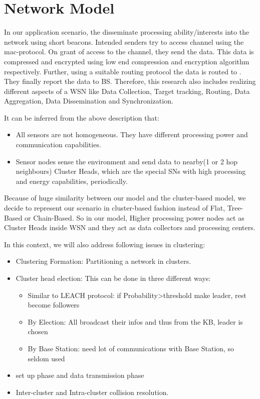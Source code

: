 \chapter{Network Model}\label{ch:model}


In our application scenario, the \chs disseminate processing ability/interests into the network using short beacons. Intended senders try to access channel using the mac-protocol. On grant of access to the channel, they send the data. This data is compressed and encrypted using low end compression and encryption algorithm respectively. Further, using a suitable routing protocol the data is routed to \chs. They finally report the data to BS. Therefore, this research also includes realizing different aspects of a \acf{WSN} like Data Collection, Target tracking, Routing, Data Aggregation, Data Dissemination and Synchronization. 

It can be inferred from the above description that:
\begin{itemize}
	
	\item All sensors are not homogeneous. They have different processing power and communication capabilities.
	
	\item Sensor nodes sense the environment and send data to nearby(1 or 2 hop neighbours) Cluster Heads, which are the special \acp{SN} with high processing and energy capabilities, periodically.
	
\end{itemize}

Because of huge similarity between our model and the cluster-based model, we decide to represent our scenario in cluster-based fashion instead of Flat, Tree-Based or Chain-Based. So in our model, Higher processing power nodes act as Cluster Heads inside \acf{WSN} and they act as data collectors and processing centers.

In this context, we will also address following issues in clustering:

\begin{itemize}
\item Clustering Formation: Partitioning a network in clusters.

\item Cluster head election: This can be done in three different ways:

\begin{itemize}
\item Similar to LEACH protocol: if Probability>threshold make leader, rest become followers

\item By Election: All broadcast their infos and thus from the KB, leader is chosen

\item By Base Station: need lot of communications with Base Station, so seldom used

\end{itemize}
\item set up phase and data transmission phase
\item Inter-cluster and Intra-cluster collision resolution.

\end{itemize}

